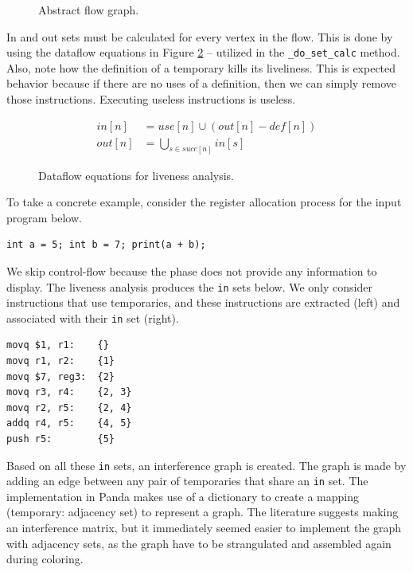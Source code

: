 \begin{figure}[H]
    \centering
    
    \caption{Abstract flow graph.}
    \label{fig:in-out-flow}
\end{figure}

In and out sets must be calculated for every vertex in the flow. This is done by using the dataflow equations in Figure \ref{fig:dataflow-eq} -- utilized in the \texttt{\_do\_set\_calc} method. Also, note how the definition of a temporary kills its liveliness. This is expected behavior because if there are no uses of a definition, then we can simply remove those instructions. Executing useless instructions is useless. 

\begin{figure}[H]
    \begin{align*}
        in[n] &= use[n] \cup (out[n] - def[n])\\
        out[n] &= \bigcup\limits_{s \in succ[n]} in[s]
    \end{align*}
    \caption{Dataflow equations for liveness analysis.}
    \label{fig:dataflow-eq}
\end{figure}

To take a concrete example, consider the register allocation process for the input program below.

\begin{verbatim}
int a = 5; int b = 7; print(a + b);
\end{verbatim}

We skip control-flow because the phase does not provide any information to display. The liveness analysis produces the \texttt{in} sets below. We only consider instructions that use temporaries, and these instructions are extracted (left) and associated with their \texttt{in} set (right).

\begin{verbatim}
movq $1, r1:    {}
movq r1, r2:    {1}   
movq $7, reg3:  {2}   
movq r3, r4:    {2, 3}
movq r2, r5:    {2, 4}
addq r4, r5:    {4, 5}
push r5:        {5}
\end{verbatim}

Based on all these \texttt{in} sets, an interference graph is created. The graph is made by adding an edge between any pair of temporaries that share an \texttt{in} set. The implementation in Panda makes use of a dictionary to create a mapping (temporary: adjacency set) to represent a graph. The literature suggests making an interference matrix, but it immediately seemed easier to implement the graph with adjacency sets, as the graph have to be strangulated and assembled again during coloring.

